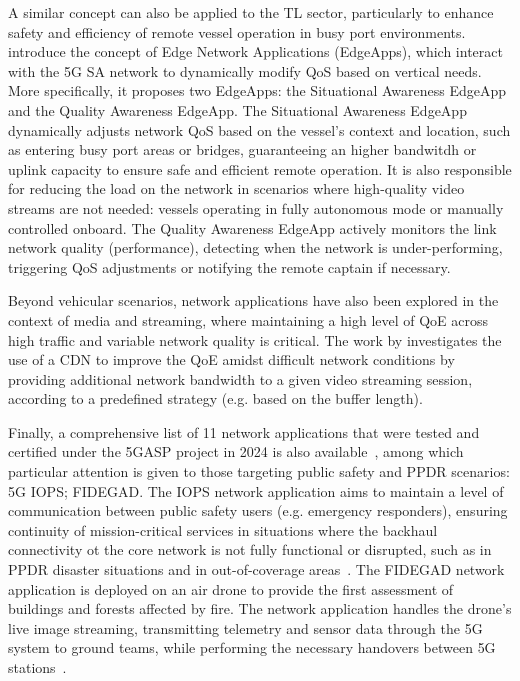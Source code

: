 A similar concept can also be applied to the \ac{TL} sector, particularly to enhance safety and efficiency of remote vessel operation in busy port environments. \citet{NextGenConnectivityDynamicQoS} introduce the concept of Edge Network Applications (EdgeApps), which interact with the \acs{5G SA} network to dynamically modify \acf{QoS} based on vertical needs. More specifically, it proposes two EdgeApps: the Situational Awareness EdgeApp and the Quality Awareness EdgeApp. The Situational Awareness EdgeApp dynamically adjusts network \acs{QoS} based on the vessel's context and location, such as entering busy port areas or bridges, guaranteeing an higher bandwitdh or uplink capacity to ensure safe and efficient remote operation. It is also responsible for reducing the load on the network in scenarios where high-quality video streams are not needed: vessels operating in fully autonomous mode or manually controlled onboard. The Quality Awareness EdgeApp actively monitors the link network quality (performance), detecting when the network is under-performing, triggering \acs{QoS} adjustments or notifying the remote captain if necessary.

Beyond vehicular scenarios, network applications have also been explored in the context of media and streaming, where maintaining a high level of \ac{QoE} across high traffic and variable network quality is critical. The work by \citet{BenefitsCaveatsQoDNetworkAPIsVideoStreaming} investigates the use of a \ac{CDN}  to improve the \ac{QoE} amidst difficult network conditions by providing additional network bandwidth to a given video streaming session, according to a predefined strategy (e.g. based on the buffer length).

Finally, a comprehensive list of 11 network applications that were tested and certified under the 5GASP project in 2024 is also available~\cite{NetApps5GASP}, among which particular attention is given to those targeting public safety and \ac{PPDR} scenarios: \ac{5G} \ac{IOPS}; \ac{FIDEGAD}. The \ac{IOPS} network application aims to maintain a level of communication between public safety users (e.g. emergency responders), ensuring continuity of mission-critical services in situations where the backhaul connectivity ot the core network is not fully functional or disrupted, such as in \ac{PPDR} disaster situations and in out-of-coverage areas~\cite{IOPS5G}. The \ac{FIDEGAD} network application is deployed on an air drone to provide the first assessment of buildings and forests affected by fire. The network application handles the drone's live image streaming, transmitting telemetry and sensor data through the \ac{5G} system to ground teams, while performing the necessary handovers between \ac{5G} stations~\cite{FIDEGAD5G}.

